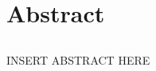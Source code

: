 \renewcommand{\CVSrevision}{\version$Id: abstract.tex,v 1.4 2009/07/14 14:05:11 ith Exp $}
% 
% 
\chapter*{Abstract}
\label{ch:abstract}
\section*{}
INSERT ABSTRACT HERE
